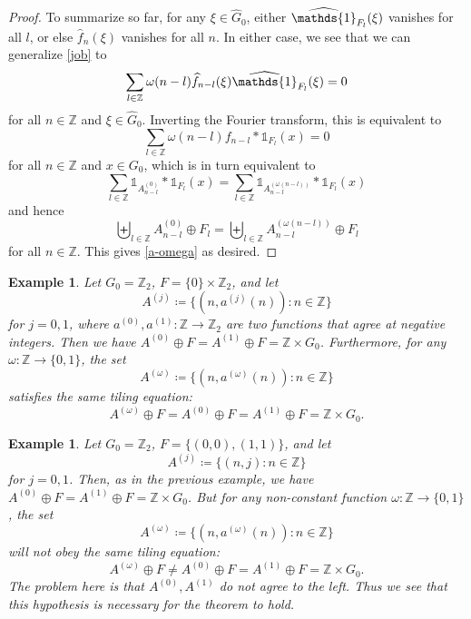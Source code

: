 \documentclass[reqno,a4paper,12pt]{amsart}
\numberwithin{equation}{section}
\numberwithin{figure}{section}
\def\Z{\mathbb{Z}}
\def\one{\mathds{1}}
\renewcommand\hat{\widehat}
\newcommand{\ft}[1]{\widehat #1}
\theoremstyle{plain}
\newtheorem{example}[thm]{Example}
\theoremstyle{definition}
\begin{document}
\begin{proof}
To summarize so far, for any $\xi \in \hat G_0$, either $\ft{\one_{F_l}}(\xi)$ vanishes for all $l$, or else $\ft{f_n}(\xi)$ vanishes for all $n$.  In either case, we see that we can generalize \eqref{job} to
$$ \sum_{l \in \Z} \omega(n-l) \ft{f_{n-l}}(\xi) \ft{\one_{F_l}}(\xi) = 0$$
for all $n \in \Z$ and $\xi \in \hat G_0$.  Inverting the Fourier transform, this is equivalent to
$$ \sum_{l \in \Z} \omega(n-l) f_{n-l} * \one_{F_l}(x) = 0$$
for all $n \in \Z$ and $x \in G_0$, which is in turn equivalent to
$$
\sum_{l \in \Z} \one_{A^{(0)}_{n-l}} * \one_{F_l}(x) =  \sum_{l \in \Z} \one_{A^{(\omega(n-l))}_{n-l}} * \one_{F_l}(x)
$$
and hence
$$ \biguplus_{l \in \Z} A^{(0)}_{n-l} \oplus F_l = 
 \biguplus_{l \in \Z} A^{(\omega(n-l))}_{n-l} \oplus F_l$$
 for all $n \in \Z$.  This gives \eqref{a-omega} as desired.
\end{proof}

\begin{example}  Let $G_0 = \Z_2$, $F = \{0\} \times \Z_2$, and let
$$ A^{(j)} \coloneqq \{ (n, a^{(j)}(n)): n \in \Z\}$$
for $j=0,1$, where $a^{(0)}, a^{(1)} \colon \Z \to \Z_2$ are two functions that agree at negative integers.  Then we have $A^{(0)} \oplus F = A^{(1)} \oplus F = \Z \times G_0$.  Furthermore, for any $\omega \colon \Z \to \{0,1\}$, the set
$$ A^{(\omega)} \coloneqq \{ (n, a^{(\omega)}(n)): n \in \Z\}$$
satisfies the same tiling equation:
$$ A^{(\omega)} \oplus F = A^{(0)} \oplus F = A^{(1)} \oplus F = \Z \times G_0.$$
\end{example}

\begin{example}  Let $G_0 = \Z_2$, $F = \{ (0,0), (1,1)\}$, and let
$$ A^{(j)} \coloneqq \{ (n, j): n \in \Z\}$$
for $j=0,1$.  Then, as in the previous example, we have $A^{(0)} \oplus F = A^{(1)} \oplus F = \Z \times G_0$.  But for any non-constant function $\omega \colon \Z \to \{0,1\}$, the set
$$ A^{(\omega)} \coloneqq \{ (n, a^{(\omega)}(n)): n \in \Z\}$$
will \emph{not} obey the same tiling equation:
$$ A^{(\omega)} \oplus F \neq A^{(0)} \oplus F = A^{(1)} \oplus F = \Z \times G_0.$$
The problem here is that $A^{(0)}, A^{(1)}$ do not agree to the left.  Thus we see that this hypothesis is necessary for the theorem to hold.
\end{example}
\end{document}
